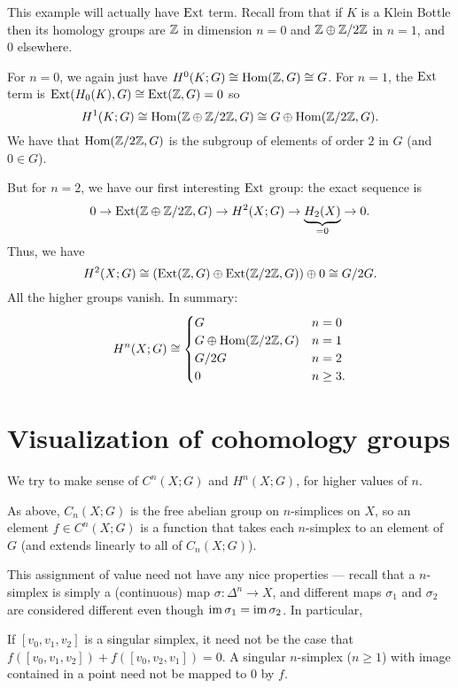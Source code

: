 \begin{example}
	This example will actually have $\operatorname{Ext}$ term.
	Recall from  that if $K$ is a Klein Bottle then its homology groups are
	$\mathbb Z$ in dimension $n=0$ and $\mathbb Z \oplus \mathbb Z/2\mathbb Z$ in $n=1$, and $0$ elsewhere.

	For $n=0$, we again just have $H^0(K;G) \cong \operatorname{Hom}(\mathbb Z, G) \cong G$.
	For $n=1$, the $\operatorname{Ext}$ term is $\operatorname{Ext}(H_0(K), G) \cong \operatorname{Ext}(\mathbb Z, G) = 0$
	so \[ H^1(K;G) \cong \operatorname{Hom}(\mathbb Z \oplus \mathbb Z/2\mathbb Z, G) \cong G \oplus \operatorname{Hom}(\mathbb Z/2\mathbb Z, G). \]
	We have that $\operatorname{Hom}(\mathbb Z/2\mathbb Z,G)$ is the subgroup
	of elements of order $2$ in $G$ (and $0 \in G$).

	But for $n=2$, we have our first interesting $\operatorname{Ext}$ group:
	the exact sequence is
	\[ 0 \to \operatorname{Ext}(\mathbb Z \oplus \mathbb Z/2\mathbb Z, G) \to H^2(X;G) \to \underbrace{H_2(X)}_{=0} \to 0. \]
	Thus, we have
	\[ H^2(X;G) \cong \left( \operatorname{Ext}(\mathbb Z,G) \oplus \operatorname{Ext}(\mathbb Z/2\mathbb Z,G) \right) \oplus 0
		\cong G/2G. \]
	All the higher groups vanish.
	In summary:
	\[
		H^n(X;G) \cong
		\begin{cases}
			G & n = 0 \\
			G \oplus \operatorname{Hom}(\mathbb Z/2\mathbb Z, G) & n = 1 \\
			G/2G & n = 2 \\
			0 & n \ge 3.
		\end{cases}
	\]
\end{example}

\section{Visualization of cohomology groups}
\label{sec:visual_cohom_groups}

We try to make sense of $C^n(X; G)$ and $H^n(X; G)$, for higher values of $n$.

As above, $C_n(X; G)$ is the free abelian group on $n$-simplices on $X$, so an element
$f \in C^n(X; G)$ is a function that takes each $n$-simplex to an element of $G$
(and extends linearly to all of $C_n(X; G)$).

This assignment of value need not have any nice properties --- recall that a $n$-simplex is simply
a (continuous) map $\sigma \colon \Delta^n \to X$, and different maps $\sigma_1$ and
$\sigma_2$ are considered different even though $\operatorname{im} \sigma_1 = \operatorname{im} \sigma_2$.
In particular,
\begin{itemize}
	\ii If $[v_0, v_1, v_2]$ is a singular simplex,
	it need not be the case that $f([v_0, v_1, v_2]) + f([v_0, v_2, v_1]) = 0$.
	\ii A singular $n$-simplex ($n \geq 1$)
	with image contained in a point need not be mapped to $0$ by $f$.
\end{itemize}

